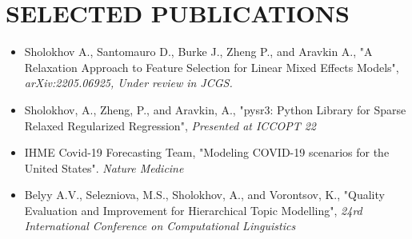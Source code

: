\documentclass[10pt,letterpaper,roman]{moderncv}        %
\begin{document}
\section{SELECTED PUBLICATIONS}
 
 \begin{itemize}
 		\item Sholokhov A., Santomauro D., Burke J., Zheng P., and Aravkin A., "A Relaxation Approach to Feature Selection for Linear Mixed Effects Models", \textit{arXiv:2205.06925, Under review in JCGS.}
 		\item Sholokhov, A., Zheng, P., and Aravkin, A., "pysr3: Python Library for Sparse Relaxed Regularized Regression", \textit{Presented at ICCOPT 22}
        \item IHME Covid-19 Forecasting Team, "Modeling COVID-19 scenarios for the United States". \textit{Nature Medicine}
        \item Belyy A.V., Selezniova, M.S., Sholokhov, A., and Vorontsov, K., "Quality Evaluation and Improvement for Hierarchical Topic Modelling",  \textit{24rd International Conference on Computational Linguistics}
    \end{itemize}


%


\end{document}
